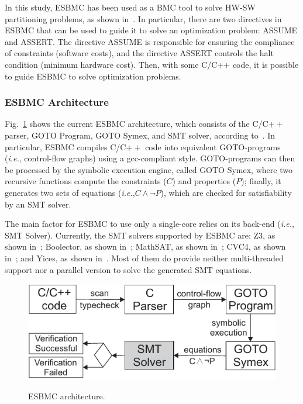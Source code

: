 \documentclass{doublecol-new}
\theoremstyle{TH}{
\newtheorem{lemma}{Lemma}
\newtheorem{theorem}[lemma]{Theorem}
\newtheorem{corrolary}[lemma]{Corrolary}
\newtheorem{conjecture}[lemma]{Conjecture}
\newtheorem{proposition}[lemma]{Proposition}
\newtheorem{claim}[lemma]{Claim}
\newtheorem{stheorem}[lemma]{Wrong Theorem}
\newtheorem{algorithm}{Algorithm}
}
\theoremstyle{THrm}{
\newtheorem{definition}{Definition}[section]
\newtheorem{question}{Question}[section]
\newtheorem{remark}{Remark}
\newtheorem{scheme}{Scheme}
}
\theoremstyle{THhit}{
\newtheorem{case}{Case}[section]
}
\begin{document}
In this study, ESBMC has been used as a BMC tool to solve HW-SW partitioning problems, as shown in~\cite{Cordeiro2012}. 
In particular, there are two directives in ESBMC that can be used to guide it to solve an optimization problem: ASSUME and ASSERT. The directive ASSUME is responsible for ensuring the compliance of constraints (software costs), and the directive ASSERT controls the halt condition (minimum hardware cost). Then, with some C/C++ code, it is possible to guide ESBMC to solve optimization problems.

\subsubsection{ESBMC Architecture}
\label{ESBMCArchitecture}

Fig.~\ref{ESBMC-Architecture} shows the current ESBMC architecture, which consists of the C/C$++$ parser, GOTO Program, GOTO Symex, and SMT solver, according to~\cite{Ramalho2013}. In particular, ESBMC compiles C/C$++$ code into equivalent GOTO-programs ({\it i.e.}, control-flow graphs) using a gcc-compliant style. GOTO-programs can then be processed by the symbolic execution engine, called GOTO Symex, where two recursive functions compute the constraints ($C$) and properties ($P$); finally, it generates two sets of equations ({\it i.e.},\:$C \land \neg P$), which are checked for satisfiability by an SMT solver. 

The main factor for ESBMC to use only a single-core relies on its back-end ({\it i.e.}, SMT Solver). Currently, the SMT solvers supported by ESBMC are: Z3, as shown in~\cite{DeMoura2008}; Boolector, as shown in~\cite{Brummayer2009}; MathSAT, as shown in~\cite{Barrett2011}; CVC4, as shown in~\cite{Bozzano2005}; and Yices, as shown in~\cite{Dutertre2014}. Most of them do provide neither multi-threaded support nor a parallel version to solve the generated SMT equations.

\begin{figure}[ht]
	\caption{ESBMC architecture.}
	\centering
	\includegraphics[scale=0.9]{figures/esbmc-arch-new.pdf} 
	\label{ESBMC-Architecture}
\end{figure}
\end{document}
